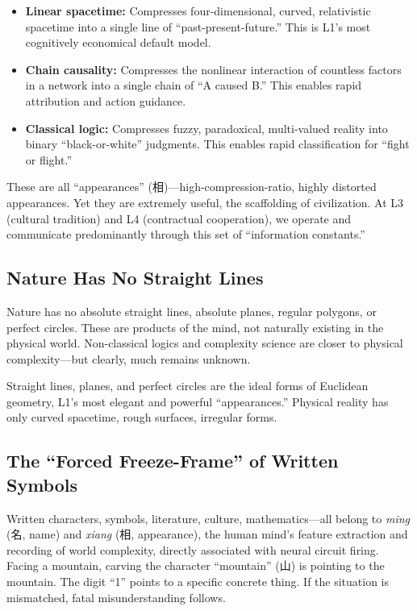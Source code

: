 \documentclass[11pt,a4paper]{article}
\begin{document}
\begin{itemize}[nosep]
    \item \textbf{Linear spacetime:} Compresses four-dimensional, curved, relativistic spacetime into a single line of ``past-present-future.'' This is L1's most cognitively economical default model.
    \item \textbf{Chain causality:} Compresses the nonlinear interaction of countless factors in a network into a single chain of ``A caused B.'' This enables rapid attribution and action guidance.
    \item \textbf{Classical logic:} Compresses fuzzy, paradoxical, multi-valued reality into binary ``black-or-white'' judgments. This enables rapid classification for ``fight or flight.''
\end{itemize}

These are all ``appearances'' (相)---high-compression-ratio, highly distorted appearances. Yet they are extremely useful, the scaffolding of civilization. At L3 (cultural tradition) and L4 (contractual cooperation), we operate and communicate predominantly through this set of ``information constants.''

\subsection{Nature Has No Straight Lines}

Nature has no absolute straight lines, absolute planes, regular polygons, or perfect circles. These are products of the mind, not naturally existing in the physical world. Non-classical logics and complexity science are closer to physical complexity---but clearly, much remains unknown.

Straight lines, planes, and perfect circles are the ideal forms of Euclidean geometry, L1's most elegant and powerful ``appearances.'' Physical reality has only curved spacetime, rough surfaces, irregular forms.

\subsection{The ``Forced Freeze-Frame'' of Written Symbols}

Written characters, symbols, literature, culture, mathematics---all belong to \textit{ming} (名, name) and \textit{xiang} (相, appearance), the human mind's feature extraction and recording of world complexity, directly associated with neural circuit firing. Facing a mountain, carving the character ``mountain'' (山) is pointing to the mountain. The digit ``1'' points to a specific concrete thing. If the situation is mismatched, fatal misunderstanding follows.
\end{document}
